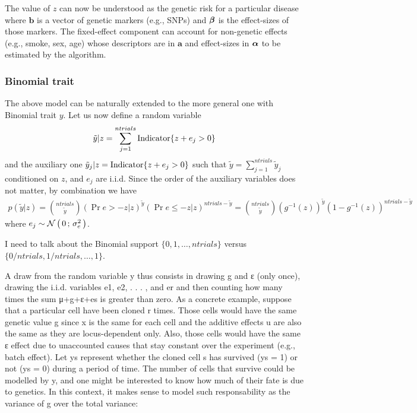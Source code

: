 The value of $z$ can now be understood as the genetic risk for a particular
disease where $\mathbf b$ is a vector of genetic markers (e.g., SNPs) and
$\boldsymbol\beta$ is the effect-sizes of those markers. The fixed-effect component can
account for non-genetic effects (e.g., smoke, sex, age) whose descriptors are in
$\mathbf a$ and effect-sizes in $\boldsymbol\alpha$ to be estimated by the algorithm.

\subsubsection{Binomial trait}

The above model can be naturally extended to the more general one with Binomial
trait $y$. Let us now define a random variable
\begin{align*}
\tilde y | z = \sum_{j=1}^{ntrials} \text{Indicator}\{ {z+e_j > 0} \}
\end{align*}
and the auxiliary one $\tilde y_j | z = \text{Indicator}\{ {z+e_j > 0} \}$ such that $\tilde y = \sum_{j=1}^{ntrials} \tilde y_j$ conditioned on $z$, and $e_j$ are i.i.d. Since the order of the auxiliary variables does not matter, by combination we have
\begin{align*}
p(\tilde y|z) = {ntrials \choose \tilde y} (\Pr{e > -z|z})^{\tilde y} (\Pr{e \leq -z|z})^{ntrials - \tilde y} =
	{ntrials \choose \tilde y} (g^{-1}(z))^{\tilde y} (1-g^{-1}(z))^{ntrials - \tilde y}
\end{align*}
where $e_j \sim \mathcal{N}\left(\, {0} \,;\, {\sigma_e^2} \,\right)$.

I need to talk about the Binomial support $\{0, 1, \dots, ntrials\}$ versus
$\{0/ntrials, 1/ntrials, \dots, 1\}$.

A draw from the random variable y thus consists in drawing g and ε (only once),
drawing the i.i.d. variables e1, e2, . . . , and er and then counting how many
times the sum μ+g+ε+es is greater than zero. As a concrete example, suppose that
a particular cell have been cloned r times. Those cells would have the same
genetic value g since x is the same for each cell and the additive effects u are
also the same as they are locus-dependent only. Also, those cells would have the
same ε effect due to unaccounted causes that stay constant over the experiment
(e.g., batch effect). Let ys represent whether the cloned cell s has survived
(ys = 1) or not (ys = 0) during a period of time. The number of cells that
survive could be modelled by y, and one might be interested to know how much of
their fate is due to genetics. In this context, it makes sense to model such
responsability as the variance of g over the total variance:

